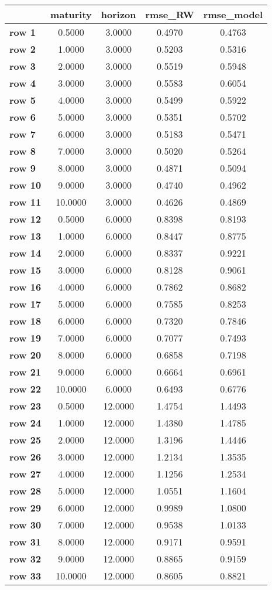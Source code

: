 \begin{tiny}\begin{tabular}{|l|c|c|c|c|}
\hline
&\textbf{maturity}&\textbf{horizon}&\textbf{rmse_RW}&\textbf{rmse_model}\\\hline
\textbf{row 1}&0.5000&3.0000&0.4970&0.4763\\\hline
\textbf{row 2}&1.0000&3.0000&0.5203&0.5316\\\hline
\textbf{row 3}&2.0000&3.0000&0.5519&0.5948\\\hline
\textbf{row 4}&3.0000&3.0000&0.5583&0.6054\\\hline
\textbf{row 5}&4.0000&3.0000&0.5499&0.5922\\\hline
\textbf{row 6}&5.0000&3.0000&0.5351&0.5702\\\hline
\textbf{row 7}&6.0000&3.0000&0.5183&0.5471\\\hline
\textbf{row 8}&7.0000&3.0000&0.5020&0.5264\\\hline
\textbf{row 9}&8.0000&3.0000&0.4871&0.5094\\\hline
\textbf{row 10}&9.0000&3.0000&0.4740&0.4962\\\hline
\textbf{row 11}&10.0000&3.0000&0.4626&0.4869\\\hline
\textbf{row 12}&0.5000&6.0000&0.8398&0.8193\\\hline
\textbf{row 13}&1.0000&6.0000&0.8447&0.8775\\\hline
\textbf{row 14}&2.0000&6.0000&0.8337&0.9221\\\hline
\textbf{row 15}&3.0000&6.0000&0.8128&0.9061\\\hline
\textbf{row 16}&4.0000&6.0000&0.7862&0.8682\\\hline
\textbf{row 17}&5.0000&6.0000&0.7585&0.8253\\\hline
\textbf{row 18}&6.0000&6.0000&0.7320&0.7846\\\hline
\textbf{row 19}&7.0000&6.0000&0.7077&0.7493\\\hline
\textbf{row 20}&8.0000&6.0000&0.6858&0.7198\\\hline
\textbf{row 21}&9.0000&6.0000&0.6664&0.6961\\\hline
\textbf{row 22}&10.0000&6.0000&0.6493&0.6776\\\hline
\textbf{row 23}&0.5000&12.0000&1.4754&1.4493\\\hline
\textbf{row 24}&1.0000&12.0000&1.4380&1.4785\\\hline
\textbf{row 25}&2.0000&12.0000&1.3196&1.4446\\\hline
\textbf{row 26}&3.0000&12.0000&1.2134&1.3535\\\hline
\textbf{row 27}&4.0000&12.0000&1.1256&1.2534\\\hline
\textbf{row 28}&5.0000&12.0000&1.0551&1.1604\\\hline
\textbf{row 29}&6.0000&12.0000&0.9989&1.0800\\\hline
\textbf{row 30}&7.0000&12.0000&0.9538&1.0133\\\hline
\textbf{row 31}&8.0000&12.0000&0.9171&0.9591\\\hline
\textbf{row 32}&9.0000&12.0000&0.8865&0.9159\\\hline
\textbf{row 33}&10.0000&12.0000&0.8605&0.8821\\\hline
\end{tabular}
\end{tiny}
